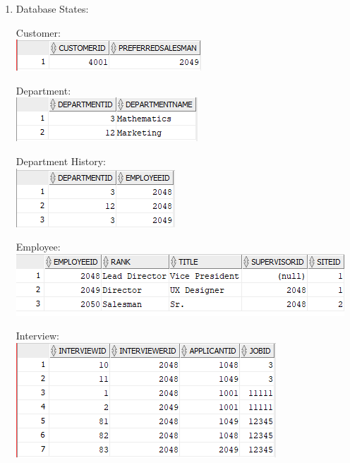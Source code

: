 \documentclass[12pt]{article}
\begin{document}
\begin{enumerate}
		\item Database States:
		\begin{center}
				Customer:\\
				\includegraphics[scale=1.5]{completed_diags/states/customer}
		\end{center}
		\begin{center}
				Department:\\
				\includegraphics[scale=1.5]{completed_diags/states/department}
		\end{center}
		\begin{center}
				Department History:\\
				\includegraphics[scale=1.5]{completed_diags/states/department_history}
		\end{center}
		\begin{center}
				Employee:\\
				\includegraphics[scale=1.2]{completed_diags/states/Employee}
		\end{center}
		\begin{center}
				Interview:\\
				\includegraphics[scale=1.5]{completed_diags/states/interview}
		\end{center}

\end{enumerate}
\end{document}
